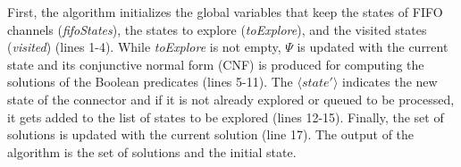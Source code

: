 First, the algorithm initializes the global variables that keep the states of FIFO channels (\emph{fifoStates}), the states to explore (\emph{toExplore}), and the visited states (\emph{visited}) (lines 1-4). While \emph{toExplore} is not empty, $\Psi$ is updated with the current state and its conjunctive normal form (CNF) is produced for computing the solutions of the Boolean predicates (lines 5-11). %
The $\langle state' \rangle$ indicates the new state of the connector and if it is not already explored or queued to be processed, it gets added to the list of states to be explored (lines 12-15). 
Finally, the set of solutions is updated with the current solution (line 17). The output of the algorithm is the set of solutions and the initial state.

